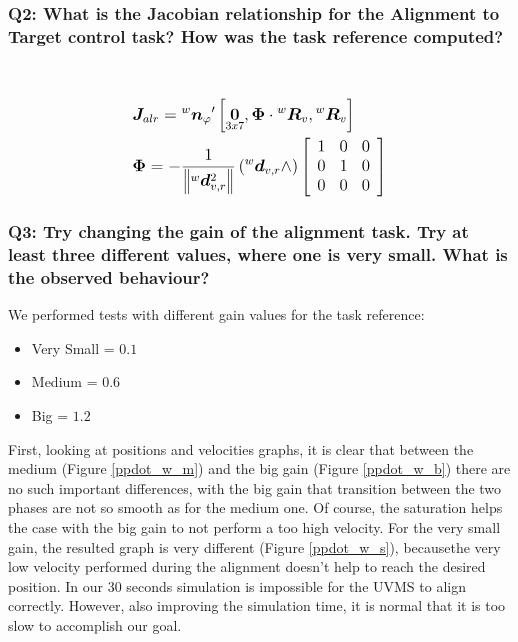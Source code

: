 \documentclass{article}
\newcommand{\ocio} {\marginpar{!}}
\begin{document}
\subsubsection{Q2: What is the Jacobian relationship for the Alignment to Target control task? How was the task reference computed?} \

\begin{equation}
\large
\begin{aligned}
&\boldsymbol{J}_{alr}={^w}{\boldsymbol{n}_\varphi}^{\prime}\left[\underset{3 x 7}{\boldsymbol{0}}, \boldsymbol{\Phi} \cdot {^w} \boldsymbol{R}_{v},{^w} \boldsymbol{R}_{v}\right]\\
&\boldsymbol{\Phi}=-\frac{1}{\left\|{^w}\boldsymbol{d}_{v, r}^{2}\right\|}\left({^w}\boldsymbol{d}_{v, r} \wedge\right)\left[\begin{array}{lll}
1 & 0 & 0 \\
0 & 1 & 0 \\
0 & 0 & 0
\end{array}\right]
\end{aligned}
\end{equation}
 \ocio

\subsubsection{Q3: Try changing the gain of the alignment task. Try at least three different values, where one is very small. What is the observed behaviour?} 
We performed tests with different gain values for the task reference:
\begin{itemize}
	\item Very Small = $0.1$
	\item Medium = $0.6$
	\item Big = $1.2$
\end{itemize}
First, looking at positions and velocities graphs, it is clear that between the medium (Figure \ref{ppdot_w_m}) and the big gain (Figure \ref{ppdot_w_b}) there are no such important differences, with the big gain that transition between the two phases are not so smooth as for the medium one. Of course, the saturation helps the case with the big gain to not perform a too high velocity. 
For the very small gain, the resulted graph is very different (Figure \ref{ppdot_w_s}), becausethe very low velocity performed during the alignment doesn't help to reach the desired position. In our 30 seconds simulation is impossible for the UVMS to align correctly. However, also improving the simulation time, it is normal that it is too slow to accomplish our goal.
\end{document}
